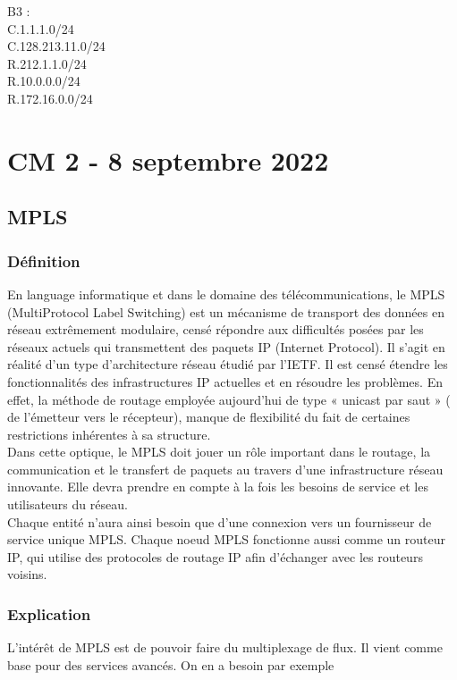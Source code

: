 \documentclass[12pt, a4paper]{article}
\begin{document}
    B3 : \\
    C.1.1.1.0/24\\
    C.128.213.11.0/24\\
    R.212.1.1.0/24\\
    R.10.0.0.0/24\\
    R.172.16.0.0/24\\

\newpage

\section{CM 2 - 8 septembre 2022}
\subsection{MPLS}
    \subsubsection{Définition}
    En language informatique et dans le domaine des télécommunications, 
    le MPLS (MultiProtocol Label Switching) est un mécanisme de transport 
    des données en réseau extrêmement modulaire, censé répondre aux difficultés 
    posées par les réseaux actuels qui transmettent des paquets IP (Internet 
    Protocol). Il s’agit en réalité d’un type d’architecture réseau étudié 
    par l’IETF. Il est censé étendre les fonctionnalités des infrastructures 
    IP actuelles et en résoudre les problèmes. En effet, la méthode de routage 
    employée aujourd’hui de type « unicast par saut » ( de l’émetteur vers le 
    récepteur), manque de flexibilité du fait de certaines restrictions 
    inhérentes à sa structure.\\

    Dans cette optique, le MPLS doit jouer un rôle important dans le routage, 
    la communication et le transfert de paquets au travers d’une infrastructure 
    réseau innovante. Elle devra prendre en compte à la fois les besoins de 
    service et les utilisateurs du réseau.\\

    Chaque entité n’aura ainsi besoin que d’une connexion vers un fournisseur 
    de service unique MPLS. Chaque noeud MPLS fonctionne aussi comme un routeur 
    IP, qui utilise des protocoles de routage IP afin d’échanger avec les 
    routeurs voisins.\\

    \subsubsection{Explication}
    L'intérêt de MPLS est de pouvoir faire du multiplexage de flux. Il vient comme
    base pour des services avancés. On en a besoin par exemple\\
\end{document}
